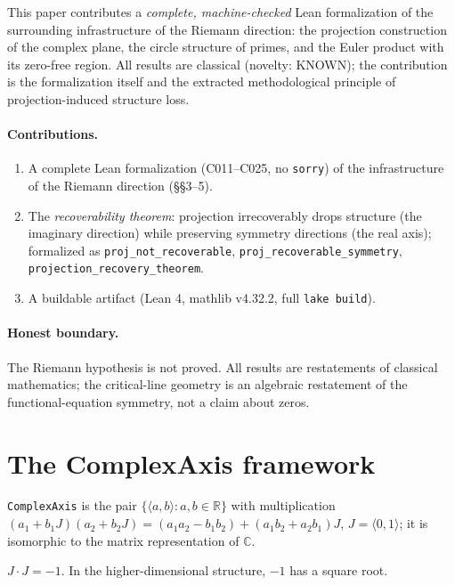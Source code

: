 \documentclass[sigplan,10pt,anonymous,review]{acmart}
\begin{document}
This paper contributes a \emph{complete, machine-checked} Lean formalization of the
surrounding infrastructure of the Riemann direction: the projection construction of
the complex plane, the circle structure of primes, and the Euler product with its
zero-free region. All results are classical (novelty: KNOWN); the contribution is the
formalization itself and the extracted methodological principle of projection-induced
structure loss.

\paragraph{Contributions.}
\begin{enumerate}
\item A complete Lean formalization (C011--C025, no \texttt{sorry}) of the
infrastructure of the Riemann direction (\S\S3--5).
\item The \emph{recoverability theorem}: projection irrecoverably drops structure
(the imaginary direction) while preserving symmetry directions (the real axis);
formalized as \texttt{proj\_not\_recoverable}, \texttt{proj\_recoverable\_symmetry},
\texttt{projection\_recovery\_theorem}.
\item A buildable artifact (Lean 4, mathlib v4.32.2, full \texttt{lake build}).
\end{enumerate}

\paragraph{Honest boundary.} The Riemann hypothesis is not proved. All results are
restatements of classical mathematics; the critical-line geometry is an algebraic
restatement of the functional-equation symmetry, not a claim about zeros.

\section{The ComplexAxis framework}

\begin{definition}[ComplexAxis]\label{def:axis}
\texttt{ComplexAxis} is the pair $\{\langle a, b\rangle : a,b \in \mathbb{R}\}$
with multiplication $(a_1+b_1J)(a_2+b_2J) = (a_1a_2-b_1b_2) + (a_1b_2+a_2b_1)J$,
$J = \langle 0,1\rangle$; it is isomorphic to the matrix representation of
$\mathbb{C}$.
\end{definition}

\begin{lemma}[$J^2 = -1$, C011]\label{lem:jsq}
$J \cdot J = -1$. In the higher-dimensional structure, $-1$ has a square root.
\end{lemma}
\end{document}

